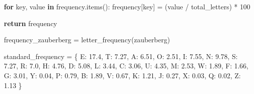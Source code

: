 \documentclass[
  nswissgerman,
  a4paper,
  DIV=11,
  numbers=noendperiod,
  ngerman]{scrreprt}
\newenvironment{Shaded}{\begin{snugshade}}{\end{snugshade}}
\newcommand{\ControlFlowTok}[1]{\textcolor[rgb]{0.00,0.23,0.31}{\textbf{#1}}}
\newcommand{\DecValTok}[1]{\textcolor[rgb]{0.68,0.00,0.00}{#1}}
\newcommand{\FloatTok}[1]{\textcolor[rgb]{0.68,0.00,0.00}{#1}}
\newcommand{\KeywordTok}[1]{\textcolor[rgb]{0.00,0.23,0.31}{\textbf{#1}}}
\newcommand{\NormalTok}[1]{\textcolor[rgb]{0.00,0.23,0.31}{#1}}
\newcommand{\OperatorTok}[1]{\textcolor[rgb]{0.37,0.37,0.37}{#1}}
\newcommand{\StringTok}[1]{\textcolor[rgb]{0.13,0.47,0.30}{#1}}
\begin{document}
\begin{Shaded}
\begin{Highlighting}[numbers=left,,]
    \ControlFlowTok{for}\NormalTok{ key, value }\KeywordTok{in}\NormalTok{ frequency.items():}
\NormalTok{        frequency[key] }\OperatorTok{=}\NormalTok{ (value }\OperatorTok{/}\NormalTok{ total\_letters) }\OperatorTok{*} \DecValTok{100}
        
           
    \ControlFlowTok{return}\NormalTok{ frequency}

\NormalTok{frequency\_zauberberg }\OperatorTok{=}\NormalTok{ letter\_frequency(zauberberg)}


\NormalTok{standard\_frequency }\OperatorTok{=}\NormalTok{ \{}
    \StringTok{\textquotesingle{}E\textquotesingle{}}\NormalTok{: }\FloatTok{17.4}\NormalTok{,}
    \StringTok{\textquotesingle{}T\textquotesingle{}}\NormalTok{: }\FloatTok{7.27}\NormalTok{,}
    \StringTok{\textquotesingle{}A\textquotesingle{}}\NormalTok{: }\FloatTok{6.51}\NormalTok{,}
    \StringTok{\textquotesingle{}O\textquotesingle{}}\NormalTok{: }\FloatTok{2.51}\NormalTok{,}
    \StringTok{\textquotesingle{}I\textquotesingle{}}\NormalTok{: }\FloatTok{7.55}\NormalTok{,}
    \StringTok{\textquotesingle{}N\textquotesingle{}}\NormalTok{: }\FloatTok{9.78}\NormalTok{,}
    \StringTok{\textquotesingle{}S\textquotesingle{}}\NormalTok{: }\FloatTok{7.27}\NormalTok{,}
    \StringTok{\textquotesingle{}R\textquotesingle{}}\NormalTok{: }\FloatTok{7.0}\NormalTok{,}
    \StringTok{\textquotesingle{}H\textquotesingle{}}\NormalTok{: }\FloatTok{4.76}\NormalTok{,}
    \StringTok{\textquotesingle{}D\textquotesingle{}}\NormalTok{: }\FloatTok{5.08}\NormalTok{,}
    \StringTok{\textquotesingle{}L\textquotesingle{}}\NormalTok{: }\FloatTok{3.44}\NormalTok{,}
    \StringTok{\textquotesingle{}C\textquotesingle{}}\NormalTok{: }\FloatTok{3.06}\NormalTok{,}
    \StringTok{\textquotesingle{}U\textquotesingle{}}\NormalTok{: }\FloatTok{4.35}\NormalTok{,}
    \StringTok{\textquotesingle{}M\textquotesingle{}}\NormalTok{: }\FloatTok{2.53}\NormalTok{,}
    \StringTok{\textquotesingle{}W\textquotesingle{}}\NormalTok{: }\FloatTok{1.89}\NormalTok{,}
    \StringTok{\textquotesingle{}F\textquotesingle{}}\NormalTok{: }\FloatTok{1.66}\NormalTok{,}
    \StringTok{\textquotesingle{}G\textquotesingle{}}\NormalTok{: }\FloatTok{3.01}\NormalTok{,}
    \StringTok{\textquotesingle{}Y\textquotesingle{}}\NormalTok{: }\FloatTok{0.04}\NormalTok{,}
    \StringTok{\textquotesingle{}P\textquotesingle{}}\NormalTok{: }\FloatTok{0.79}\NormalTok{,}
    \StringTok{\textquotesingle{}B\textquotesingle{}}\NormalTok{: }\FloatTok{1.89}\NormalTok{,}
    \StringTok{\textquotesingle{}V\textquotesingle{}}\NormalTok{: }\FloatTok{0.67}\NormalTok{,}
    \StringTok{\textquotesingle{}K\textquotesingle{}}\NormalTok{: }\FloatTok{1.21}\NormalTok{,}
    \StringTok{\textquotesingle{}J\textquotesingle{}}\NormalTok{: }\FloatTok{0.27}\NormalTok{,}
    \StringTok{\textquotesingle{}X\textquotesingle{}}\NormalTok{: }\FloatTok{0.03}\NormalTok{,}
    \StringTok{\textquotesingle{}Q\textquotesingle{}}\NormalTok{: }\FloatTok{0.02}\NormalTok{,}
    \StringTok{\textquotesingle{}Z\textquotesingle{}}\NormalTok{: }\FloatTok{1.13}
\NormalTok{\}}



\end{Highlighting}
\end{Shaded}
\end{document}
